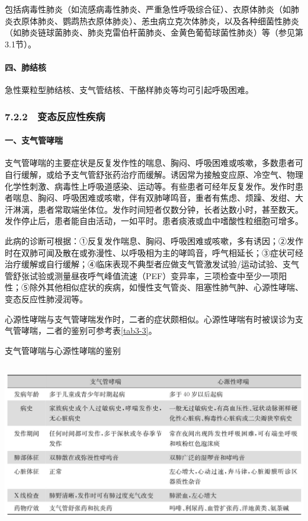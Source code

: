 包括病毒性肺炎（如流感病毒性肺炎、严重急性呼吸综合征）、衣原体肺炎（如肺炎衣原体肺炎、鹦鹉热衣原体肺炎）、恙虫病立克次体肺炎，以及各种细菌性肺炎（如肺炎链球菌肺炎、肺炎克雷伯杆菌肺炎、金黄色葡萄球菌性肺炎）等（参见第3.1节）。

\paragraph{四、肺结核}

急性粟粒型肺结核、支气管结核、干酪样肺炎等均可引起呼吸困难。

\subsubsection{7.2.2　变态反应性疾病}

\paragraph{一、支气管哮喘}

支气管哮喘的主要症状是反复发作性的喘息、胸闷、呼吸困难或咳嗽，多数患者可自行缓解，或给予支气管舒张药治疗而缓解。诱因常为接触变应原、冷空气、物理化学性刺激、病毒性上呼吸道感染、运动等。有些患者可经年反复发作。发作时患者喘息、胸闷、呼吸困难或咳嗽，伴有双肺哮鸣音，重者有焦虑、烦躁、发绀、大汗淋漓，患者常取端坐体位。发作时间短者仅数分钟，长者达数小时，甚至数天。发作停止后，患者能自由活动，一如平时。患者痰液或血中嗜酸性粒细胞可增多。

此病的诊断可根据：①反复发作喘息、胸闷、呼吸困难或咳嗽，多有诱因；②发作时在双肺可闻及散在或弥漫性、以呼吸相为主的哮鸣音，呼气相延长；③症状可经治疗缓解或自行缓解；④临床表现不典型者应做支气管激发试验/运动试验、支气管舒张试验或测量昼夜呼气峰值流速（PEF）变异率，三项检查中至少一项阳性；⑤除外其他相似症状的疾病，如慢性支气管炎、阻塞性肺气肿、心源性哮喘、变态反应性肺浸润等。

心源性哮喘与支气管哮喘发作时，二者的症状颇相似。心源性哮喘有时被误诊为支气管哮喘，二者的鉴别可参考表\ref{tab3-3}。

\begin{table}[htbp]
\centering
\caption{支气管哮喘与心源性哮喘的鉴别}
\label{tab3-3}
\includegraphics[width=5.91667in,height=2.82292in]{./images/Image00034.jpg}
\end{table}

